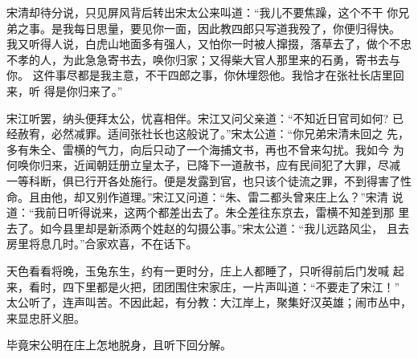 宋清却待分说，只见屏风背后转出宋太公来叫道：“我儿不要焦躁，这个不干
你兄弟之事。是我每日思量，要见你一面，因此教四郎只写道我殁了，你便归得快。
我又听得人说，白虎山地面多有强人，又怕你一时被人撺掇，落草去了，做个不忠
不孝的人，为此急急寄书去，唤你归家；又得柴大官人那里来的石勇，寄书去与你。
这件事尽都是我主意，不干四郎之事，你休埋怨他。我恰才在张社长店里回来，听
得是你归来了。”

宋江听罢，纳头便拜太公，忧喜相伴。宋江又问父亲道：“不知近日官司如何?
已经赦宥，必然减罪。适间张社长也这般说了。”宋太公道：“你兄弟宋清未回之
先，多有朱仝、雷横的气力，向后只动了一个海捕文书，再也不曾来勾扰。我如今
为何唤你归来，近闻朝廷册立皇太子，已降下一道赦书，应有民间犯了大罪，尽减
一等科断，俱已行开各处施行。便是发露到官，也只该个徒流之罪，不到得害了性
命。且由他，却又别作道理。”宋江又问道：“朱、雷二都头曾来庄上么？”宋清
说道：“我前日听得说来，这两个都差出去了。朱仝差往东京去，雷横不知差到那
里去了。如今县里却是新添两个姓赵的勾摄公事。”宋太公道：“我儿远路风尘，
且去房里将息几时。”合家欢喜，不在话下。

天色看看将晚，玉兔东生，约有一更时分，庄上人都睡了，只听得前后门发喊
起来，看时，四下里都是火把，团团围住宋家庄，一片声叫道：“不要走了宋江！”
太公听了，连声叫苦。不因此起，有分教：大江岸上，聚集好汉英雄；闹市丛中，
来显忠肝义胆。

毕竟宋公明在庄上怎地脱身，且听下回分解。